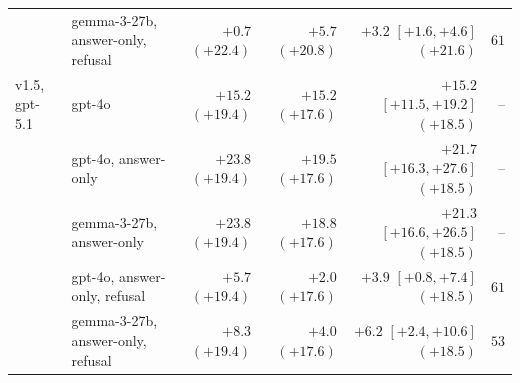 \documentclass{article}
\begin{document}
\begin{table}[htbp]
{\begin{tabular}{llrrrr}
 & gemma-3-27b, answer-only, refusal & $+0.7$ {\scriptsize$(+22.4)$} & $+5.7$ {\scriptsize$(+20.8)$} & $+3.2$ {\scriptsize$[+1.6,+4.6]$} {\scriptsize$(+21.6)$} & $61$\\
v1.5, gpt-5.1 & gpt-4o & $+15.2$ {\scriptsize$(+19.4)$} & $+15.2$ {\scriptsize$(+17.6)$} & $+15.2$ {\scriptsize$[+11.5,+19.2]$} {\scriptsize$(+18.5)$} & --\\
 & gpt-4o, answer-only & $+23.8$ {\scriptsize$(+19.4)$} & $+19.5$ {\scriptsize$(+17.6)$} & $+21.7$ {\scriptsize$[+16.3,+27.6]$} {\scriptsize$(+18.5)$} & --\\
 & gemma-3-27b, answer-only & $+23.8$ {\scriptsize$(+19.4)$} & $+18.8$ {\scriptsize$(+17.6)$} & $+21.3$ {\scriptsize$[+16.6,+26.5]$} {\scriptsize$(+18.5)$} & --\\
 & gpt-4o, answer-only, refusal & $+5.7$ {\scriptsize$(+19.4)$} & $+2.0$ {\scriptsize$(+17.6)$} & $+3.9$ {\scriptsize$[+0.8,+7.4]$} {\scriptsize$(+18.5)$} & $61$\\
 & gemma-3-27b, answer-only, refusal & $+8.3$ {\scriptsize$(+19.4)$} & $+4.0$ {\scriptsize$(+17.6)$} & $+6.2$ {\scriptsize$[+2.4,+10.6]$} {\scriptsize$(+18.5)$} & $53$\\
\bottomrule
\end{tabular}}
\end{table}
\end{document}

